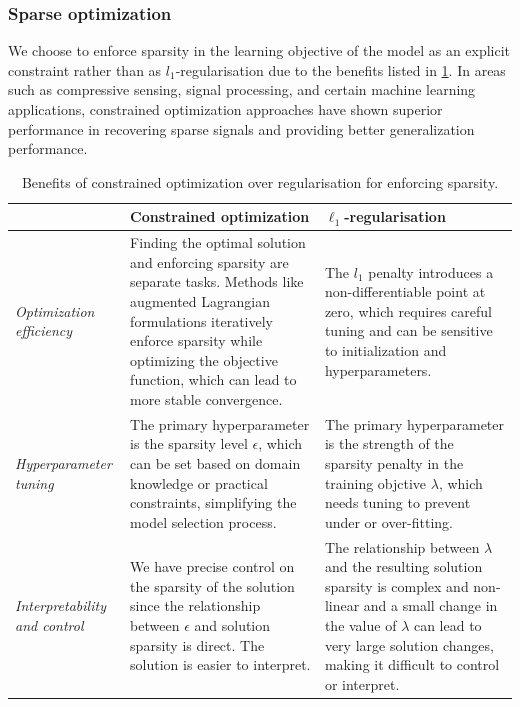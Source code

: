 \documentclass{article}
\newcommand{\sj}[1]{\textcolor{violet}{\textbf{sj:} #1}}
\begin{document}
\subsubsection{Sparse optimization}
\label{app:sparseopt}
We choose to enforce sparsity in the learning objective of the model as an explicit constraint rather than as $l_1$-regularisation due to the benefits listed in \cref{tab:sparsityreg}. In areas such as compressive sensing, signal processing, and certain machine learning applications, constrained optimization approaches have shown superior performance in recovering sparse signals and providing better generalization performance.

\begin{table}[ht]
\centering
\begin{tabularx}{\textwidth}{|X|X|X|}
   \hline 
   & \textbf{Constrained optimization} & \textbf{$\ell_1$-regularisation} \\
   \hline
   \textit{Optimization efficiency} & Finding the optimal solution and enforcing sparsity are separate tasks. Methods like augmented Lagrangian formulations iteratively enforce sparsity while optimizing the objective function, which can lead to more stable convergence. & The $l_1$ penalty introduces a non-differentiable point at zero, which requires careful tuning and can be sensitive to initialization and hyperparameters. \\
\hline
\textit{Hyperparameter tuning} & The primary hyperparameter is the sparsity level $\epsilon$, which can be set based on domain knowledge or practical constraints, simplifying the model selection process. & The primary hyperparameter is the strength of the sparsity penalty in the training objctive $\lambda$, which needs tuning to prevent under or over-fitting.\\
\hline
\textit{Interpretability and control} & We have precise control on the sparsity of the solution since the relationship between $\epsilon$ and solution sparsity is direct. The solution is easier to interpret.  &  The relationship between $\lambda$ and the resulting solution sparsity is complex and non-linear and a small change in the value of $\lambda$ can lead to very large solution changes, making it difficult to control or interpret.\\
\hline
\end{tabularx}
\caption{Benefits of constrained optimization over regularisation for enforcing sparsity.}
\label{tab:sparsityreg}
\end{table}
\end{document}
